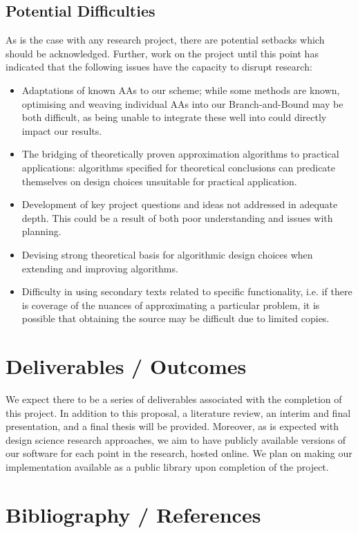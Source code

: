 \documentclass[12pt, a4paper]{article}
\begin{document}
\subsection{Potential Difficulties}
As is the case with any research project, there are potential setbacks which should be acknowledged. Further, work on the project until this point has indicated that the following issues have the capacity to disrupt research:
\begin{itemize}
  \item Adaptations of known AAs to our scheme; while some methods are known, optimising and weaving individual AAs into our Branch-and-Bound may be both difficult, as being unable to integrate these well into could directly impact our results.
  \item The bridging of theoretically proven approximation algorithms to practical applications: algorithms specified for theoretical conclusions can predicate themselves on design choices unsuitable for practical application.
  \item Development of key project questions and ideas not addressed in adequate depth. This could be a result of both poor understanding and issues with planning.
  \item Devising strong theoretical basis for algorithmic design choices when extending and improving algorithms.
  \item Difficulty in using secondary texts related to specific functionality, i.e. if there is coverage of the nuances of approximating a particular problem, it is possible that obtaining the source may be difficult due to limited copies.
\end{itemize}

\section{Deliverables / Outcomes}
We expect there to be a series of deliverables associated with the completion of this project. In addition to this proposal, a literature review, an interim and final presentation, and a final thesis will be provided. Moreover, as is expected with design science research approaches, we aim to have publicly available versions of our software for each point in the research, hosted online. We plan on making our implementation available as a public library upon completion of the project. 

\section{Bibliography / References}


\end{document}
